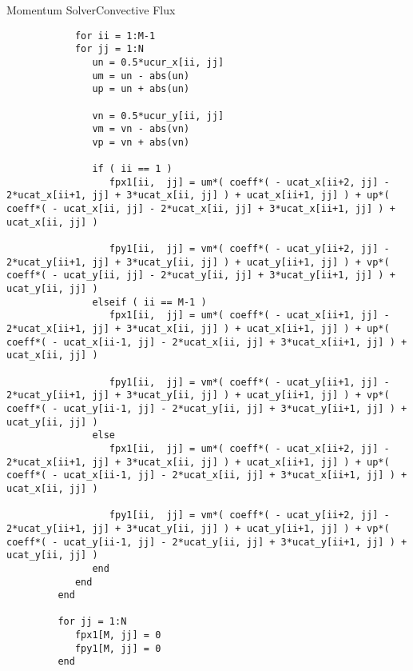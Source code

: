 \documentclass[\string~/GitHub/sthlmNordBeamerTheme/sthlmNordLightDemo.tex]{subfiles}
\begin{document}
\begin{frame}{Momentum Solver}{Convective Flux}

    \begin{center}
        \begin{verbatim}
            for ii = 1:M-1
            for jj = 1:N
               un = 0.5*ucur_x[ii, jj]
               um = un - abs(un)
               up = un + abs(un)

               vn = 0.5*ucur_y[ii, jj]
               vm = vn - abs(vn)
               vp = vn + abs(vn)

               if ( ii == 1 )
                  fpx1[ii,  jj] = um*( coeff*( - ucat_x[ii+2, jj] - 2*ucat_x[ii+1, jj] + 3*ucat_x[ii, jj] ) + ucat_x[ii+1, jj] ) + up*( coeff*( - ucat_x[ii, jj] - 2*ucat_x[ii, jj] + 3*ucat_x[ii+1, jj] ) + ucat_x[ii, jj] )

                  fpy1[ii,  jj] = vm*( coeff*( - ucat_y[ii+2, jj] - 2*ucat_y[ii+1, jj] + 3*ucat_y[ii, jj] ) + ucat_y[ii+1, jj] ) + vp*( coeff*( - ucat_y[ii, jj] - 2*ucat_y[ii, jj] + 3*ucat_y[ii+1, jj] ) + ucat_y[ii, jj] )
               elseif ( ii == M-1 )
                  fpx1[ii,  jj] = um*( coeff*( - ucat_x[ii+1, jj] - 2*ucat_x[ii+1, jj] + 3*ucat_x[ii, jj] ) + ucat_x[ii+1, jj] ) + up*( coeff*( - ucat_x[ii-1, jj] - 2*ucat_x[ii, jj] + 3*ucat_x[ii+1, jj] ) + ucat_x[ii, jj] )

                  fpy1[ii,  jj] = vm*( coeff*( - ucat_y[ii+1, jj] - 2*ucat_y[ii+1, jj] + 3*ucat_y[ii, jj] ) + ucat_y[ii+1, jj] ) + vp*( coeff*( - ucat_y[ii-1, jj] - 2*ucat_y[ii, jj] + 3*ucat_y[ii+1, jj] ) + ucat_y[ii, jj] )
               else
                  fpx1[ii,  jj] = um*( coeff*( - ucat_x[ii+2, jj] - 2*ucat_x[ii+1, jj] + 3*ucat_x[ii, jj] ) + ucat_x[ii+1, jj] ) + up*( coeff*( - ucat_x[ii-1, jj] - 2*ucat_x[ii, jj] + 3*ucat_x[ii+1, jj] ) + ucat_x[ii, jj] )

                  fpy1[ii,  jj] = vm*( coeff*( - ucat_y[ii+2, jj] - 2*ucat_y[ii+1, jj] + 3*ucat_y[ii, jj] ) + ucat_y[ii+1, jj] ) + vp*( coeff*( - ucat_y[ii-1, jj] - 2*ucat_y[ii, jj] + 3*ucat_y[ii+1, jj] ) + ucat_y[ii, jj] )
               end
            end
         end
         
         for jj = 1:N
            fpx1[M, jj] = 0
            fpy1[M, jj] = 0
         end
        \end{verbatim}
    \end{center}


\end{frame}
\end{document}
